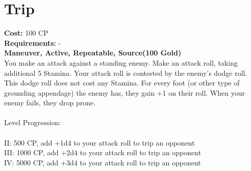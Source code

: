 \section{Trip}
\textbf{Cost:} 100 CP\\
\textbf{Requirements:} -\\
\textbf{Maneuver, Active, Repeatable, Source(100 Gold)}\\
You make an attack against a standing enemy. Make an attack roll, taking additional 5 Stamina. Your attack roll is contested by the enemy's dodge roll. This dodge roll does not cost any Stamina. For every foot (or other type of grounding appendage) the enemy has, they gain +1 on their roll. When your enemy fails, they drop prone. \\
\\
Level Progression:\\
\\
II: 500 CP, add +1d4 to your attack roll to trip an opponent\\
III: 1000 CP, add +2d4 to your attack roll to trip an opponent\\
IV: 5000 CP, add +3d4 to your attack roll to trip an opponent\\
